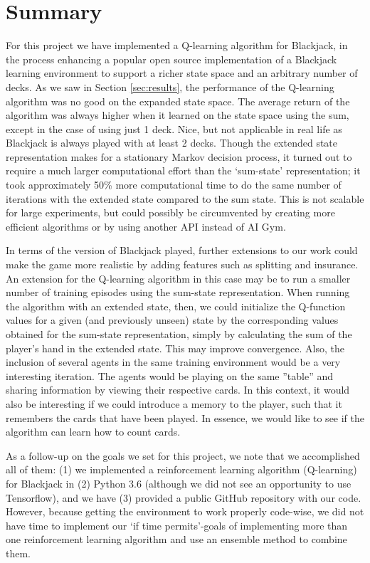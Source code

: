 \section{Summary} \label{sec:summary}
For this project we have implemented a Q-learning algorithm for Blackjack, in the process
enhancing a popular open source implementation of a Blackjack learning environment to
support a richer state space and an arbitrary number of decks. 
%
As we saw in Section \ref{sec:results}, the performance of the Q-learning algorithm was no 
good on the expanded state space. 
The average return of the algorithm was always higher when it learned on the state space using the sum,
except in the case of using just 1 deck. Nice, but not applicable in real life as Blackjack is always played
with at least 2 decks.
Though the extended state representation makes for a stationary Markov decision process, it turned out to require
a much larger computational effort than the `sum-state' representation;
it took approximately 50\% more computational time to do the same number of iterations with the extended state
compared to the sum state. This is not scalable for large experiments,
but could possibly be circumvented by creating more efficient 
algorithms or by using another API instead of AI Gym.

In terms of the version of Blackjack played,
further extensions to our work could make the game more realistic by adding features such
as splitting and insurance. An extension for the Q-learning algorithm in this case may be
to run a smaller number of training episodes using the sum-state representation.
When running the algorithm with an extended state, then, we could initialize the Q-function
values for a given (and previously unseen) state by the corresponding values obtained for
the sum-state representation, simply by calculating the sum of the player's hand in the
extended state. This may improve convergence.
%
Also, the inclusion of several agents in the same training environment would be a very interesting iteration.
The agents would be playing on the same ''table'' and sharing information by viewing their respective cards. In
this context, it would also be interesting if we could introduce a memory to the player, such that it remembers
the cards that have been played. In essence, we would like to see if the algorithm can learn how to count cards. 

As a follow-up on the goals we set for this project, we note that we accomplished all of
them: (1) we implemented a reinforcement learning algorithm (Q-learning) for Blackjack
in (2) Python 3.6 (although we did not see an opportunity to use Tensorflow), and
we have (3) provided a public GitHub repository with our code. However, because getting the 
environment to work properly code-wise, we did not have time to implement our `if time permits'-goals
of implementing more than one reinforcement learning algorithm and use an ensemble method to
combine them.
